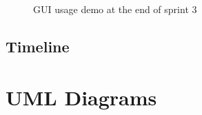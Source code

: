 \documentclass[11pt]{article} %
\begin{document}
  \begin{figure}[H]
  	\centering
  	\caption{GUI usage demo at the end of sprint 3}
  	\label{fig:GUI Design 5 demo}
  \end{figure}
  
  
\newpage
\subsection{Timeline}


\newpage
\section{UML Diagrams}
\end{document}

